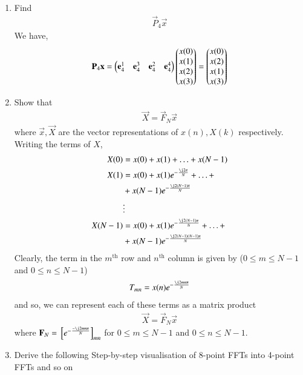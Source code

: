 \documentclass[journal,12pt,twocolumn]{IEEEtran}
\renewcommand\thesection{\arabic{section}}
\begin{document}
\begin{enumerate}[label=\arabic*.,ref=\thesection.\theenumi]
\item Find 
    \begin{align}
	     \vec{P}_4 \vec{x}
    \end{align}
	\solution We have,
	\begin{align}
		\mathbf{P}_4\mathbf{x} = \begin{pmatrix}\mathbf{e}_4^1 & \mathbf{e}_4^3 & \mathbf{e}_4^2 & \mathbf{e}_4^4\end{pmatrix}\begin{pmatrix}x(0)\\x(1)\\x(2)\\x(3)\end{pmatrix} = \begin{pmatrix}x(0)\\x(2)\\x(1)\\x(3)\end{pmatrix}
		\label{eq:x-permute}
	\end{align}
\item Show that 
    \begin{align}
	    \vec{X} = \vec{F}_N \vec{x}
	    \label{eq:dft-mat-def}
    \end{align}
		where $\vec{x}, \vec{X}$ are the vector representations of $x(n), X(k)$ respectively.
		\\
		\solution Writing the terms of $X$, 
		\begin{align}
			X(0) &= x(0) + x(1) + \ldots + x(N - 1) \\
			X(1) &= x(0) + x(1)e^{-\frac{\j2\pi}{N}} + \ldots + \nonumber \\
				 &+ x(N - 1)e^{-\frac{\j2(N - 1)\pi}{N}} \\
				 &\vdots \nonumber \\
			X(N - 1) &= x(0) + x(1)e^{-\frac{\j2(N - 1)\pi}{N}} + \ldots + \nonumber \\
					 &+ x(N - 1)e^{-\frac{\j2(N - 1)(N - 1)\pi}{N}}	
		\end{align}
		Clearly, the term in the $m^{\text{th}}$ row and $n^{\text{th}}$ column is given by ($0 \leq m \leq N - 1$ and $0 \leq n \leq N - 1$) 
		\begin{align}
			T_{mn} = x(n)e^{-\frac{\j2mn\pi}{N}} 
		\end{align}
		and so, we can represent each of these terms as a matrix product
		\begin{align}
			\vec{X} = \vec{F}_N\vec{x}
		\end{align}
		where $\vec{F}_N = \sbrak{e^{-\frac{-\j2mn\pi}{N}}}_{mn}$ for $0 \leq m \leq N - 1$ and $0 \leq n \leq N - 1$. 
\\
\item Derive the following Step-by-step visualisation  of
8-point FFTs into 4-point FFTs and so on
\begin{equation}

\end{equation}
\end{enumerate}
\end{document}
